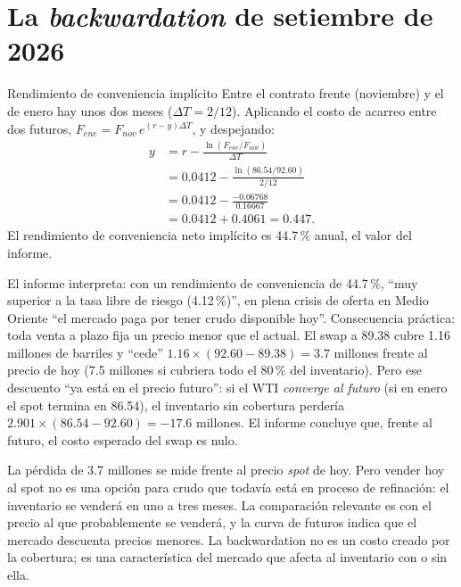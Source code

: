 
\section{La \emph{backwardation} de setiembre de 2026}


\begin{ejemplo}{Rendimiento de conveniencia implícito}
Entre el contrato frente (noviembre) y el de enero hay unos dos meses ($\Delta T=2/12$). Aplicando el costo de acarreo entre dos futuros, $F_{ene}=F_{nov}\,e^{(r-y)\Delta T}$, y despejando:
\begin{align*}
y&=r-\frac{\ln(F_{ene}/F_{nov})}{\Delta T}\\
&=0.0412-\frac{\ln(86.54/92.60)}{2/12}\\
&=0.0412-\frac{-0.06768}{0.16667}\\
&=0.0412+0.4061=0.447.
\end{align*}
El rendimiento de conveniencia neto implícito es 44.7\,\% anual, el valor del informe.
\end{ejemplo}

\begin{informe}
El informe interpreta: con un rendimiento de conveniencia de 44.7\,\%, \enquote{muy superior a la tasa libre de riesgo (4.12\,\%)}, en plena crisis de oferta en Medio Oriente \enquote{el mercado paga por tener crudo disponible hoy}. Consecuencia práctica: toda venta a plazo fija un precio menor que el actual. El swap a 89.38 cubre 1.16 millones de barriles y \enquote{cede} $1.16\times(92.60-89.38)=3.7$ millones frente al precio de hoy (7.5 millones si cubriera todo el 80\,\% del inventario). Pero ese descuento \enquote{ya está en el precio futuro}: si el WTI \emph{converge al futuro} (si en enero el spot termina en 86.54), el inventario sin cobertura perdería $2.901\times(86.54-92.60)=-17.6$ millones. El informe concluye que, frente al futuro, el costo esperado del swap es nulo.
\end{informe}

\begin{cuidado}
La pérdida de 3.7 millones se mide frente al precio \emph{spot} de hoy. Pero vender hoy al spot no es una opción para crudo que todavía está en proceso de refinación: el inventario se venderá en uno a tres meses. La comparación relevante es con el precio al que probablemente se venderá, y la curva de futuros indica que el mercado descuenta precios menores. La backwardation no es un costo creado por la cobertura; es una característica del mercado que afecta al inventario con o sin ella.
\end{cuidado}

